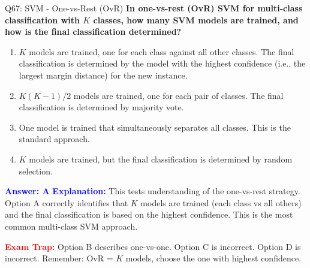 \documentclass[8pt]{beamer}
\begin{document}
	\begin{frame}{Q67: SVM - One-vs-Rest (OvR)}
		\fontsize{6.5}{7.5}\selectfont
		\textbf{In one-vs-rest (OvR) SVM for multi-class classification with $K$ classes, how many SVM models are trained, and how is the final classification determined?}
		
		\begin{enumerate}
			\item $K$ models are trained, one for each class against all other classes. The final classification is determined by the model with the highest confidence (i.e., the largest margin distance) for the new instance.
			\item $K(K-1)/2$ models are trained, one for each pair of classes. The final classification is determined by majority vote.
			\item One model is trained that simultaneously separates all classes. This is the standard approach.
			\item $K$ models are trained, but the final classification is determined by random selection.
		\end{enumerate}
		
		\vspace{0.1cm}
		\textcolor{blue}{\textbf{Answer: A}}
		\vspace{0.1cm}
		\textcolor{blue}{\textbf{Explanation:}} This tests understanding of the one-vs-rest strategy. Option A correctly identifies that $K$ models are trained (each class vs all others) and the final classification is based on the highest confidence. This is the most common multi-class SVM approach.
		
		\textcolor{red}{\textbf{Exam Trap:}} Option B describes one-vs-one. Option C is incorrect. Option D is incorrect. Remember: OvR = $K$ models, choose the one with highest confidence.
	\end{frame}
	
\end{document}
